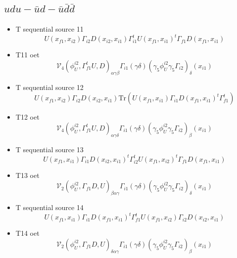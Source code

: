 \documentclass{article}[12pt]
\begin{document}
\subsection{$udu-\bar{u}d-\bar{u}\bar{d}\bar{d}$}
\begin{itemize}
\item T sequential source 11
$$
U(x_{f1},x_{i2})\Gamma_{i2}D(x_{i2},x_{i1})\Gamma_{i1}^tU(x_{f1},x_{i1})^t\Gamma_{f1}D(x_{f1},x_{i1})
$$
\item T11 oet
$$
{\mathcal V}_4\left(\phi_U^{i2},\Gamma_{f1}^tU,D\right)_{\alpha\gamma\beta}
\Gamma_{i1}(\gamma\delta)(\gamma_5\phi_U^{i2}\gamma_5\Gamma_{i2})_\delta(x_{i1})
$$
\item T sequential source 12
$$
U(x_{f1},x_{i2})\Gamma_{i2}D(x_{i2},x_{i1})\mathrm{Tr}\left(U(x_{f1},x_{i1})\Gamma_{i1}D(x_{f1},x_{i1})^t\Gamma_{f1}^t\right)
$$
\item T12 oet
$$
{\mathcal V}_4\left(\phi_U^{i2},\Gamma_{f1}^tU,D\right)_{\alpha\gamma\delta}
\Gamma_{i1}(\gamma\delta)(\gamma_5\phi_U^{i2}\gamma_5\Gamma_{i2})_\beta(x_{i1})
$$
\item T sequential source 13
$$
U(x_{f1},x_{i1})\Gamma_{i1}D(x_{i2},x_{i1})^t\Gamma_{i2}^tU(x_{f1},x_{i2})^t\Gamma_{f1}D(x_{f1},x_{i1})
$$
\item T13 oet
$$
{\mathcal V}_2\left(\phi_U^{i2},\Gamma_{f1}D,U\right)_{\beta\alpha\gamma}
\Gamma_{i1}(\gamma\delta)(\gamma_5\phi_U^{i2}\gamma_5\Gamma_{i2})_\delta(x_{i1})
$$
\item T sequential source 14
$$
U(x_{f1},x_{i1})\Gamma_{i1}D(x_{f1},x_{i1})^t\Gamma_{f1}^tU(x_{f1},x_{i2})\Gamma_{i2}D(x_{i2},x_{i1})
$$
\item T14 oet
$$
{\mathcal V}_2\left(\phi_U^{i2},\Gamma_{f1}D,U\right)_{\delta\alpha\gamma}
\Gamma_{i1}(\gamma\delta)(\gamma_5\phi_U^{i2}\gamma_5\Gamma_{i2})_\beta(x_{i1})
$$
\end{itemize}
\end{document}
